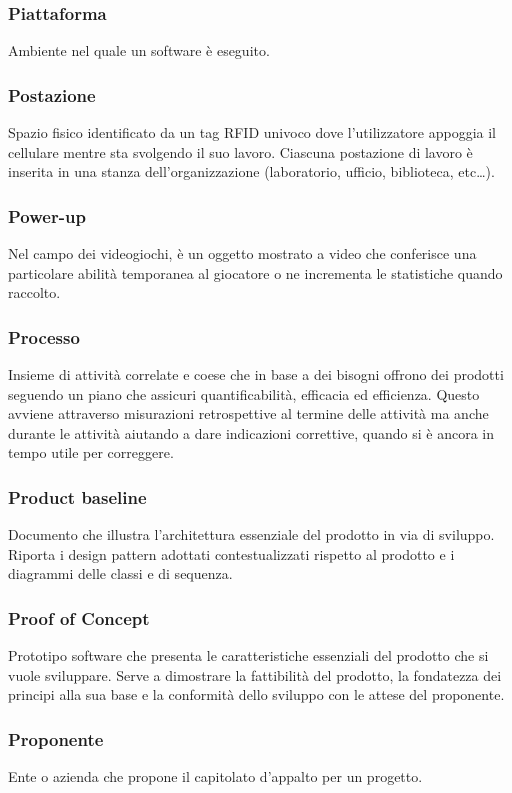 \subsubsection*{Piattaforma} Ambiente nel quale un software è eseguito.
\subsubsection*{Postazione} Spazio fisico identificato da un tag RFID univoco dove l’utilizzatore appoggia il cellulare mentre sta svolgendo il suo lavoro. Ciascuna postazione di lavoro è inserita in una stanza
dell'organizzazione (laboratorio, ufficio, biblioteca, etc\dots).
\subsubsection*{Power-up} Nel campo dei videogiochi, è un oggetto mostrato a video che conferisce una particolare abilità temporanea al giocatore o ne incrementa le statistiche quando raccolto.
\subsubsection*{Processo} Insieme di attività correlate e coese che in base a dei bisogni offrono dei prodotti seguendo un piano che assicuri quantificabilità, efficacia ed efficienza. Questo avviene attraverso misurazioni retrospettive al termine delle attività ma anche durante le attività aiutando a dare indicazioni correttive, quando si è ancora in tempo utile per correggere.
\subsubsection*{Product baseline} Documento che illustra l'architettura essenziale del prodotto in via di sviluppo. \\
Riporta i design pattern adottati contestualizzati rispetto al prodotto e i diagrammi delle classi e di sequenza.
\subsubsection*{Proof of Concept} Prototipo software che presenta le caratteristiche essenziali del prodotto che si vuole sviluppare. Serve a dimostrare la fattibilità del prodotto, la fondatezza dei principi alla sua base e la conformità dello sviluppo con le attese del proponente.
\subsubsection*{Proponente} Ente o azienda che propone il capitolato d’appalto per un progetto.
